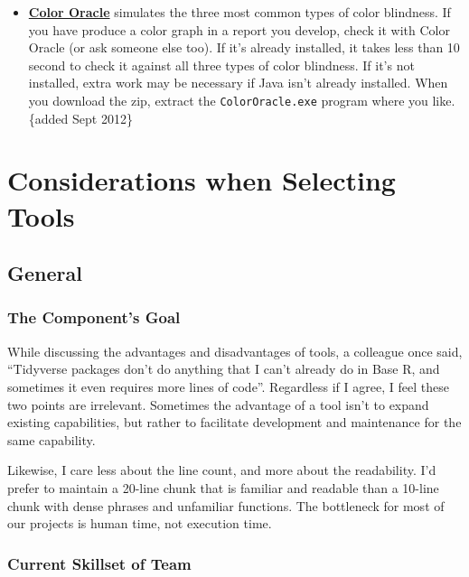 \documentclass[
]{book}
\begin{document}
\begin{itemize}
\item
  \textbf{\href{http://colororacle.org/}{Color Oracle}} simulates the three most common types of color blindness. If you have produce a color graph in a report you develop, check it with Color Oracle (or ask someone else too). If it's already installed, it takes less than 10 second to check it against all three types of color blindness. If it's not installed, extra work may be necessary if Java isn't already installed. When you download the zip, extract the \texttt{ColorOracle.exe} program where you like. \{added Sept 2012\}
\end{itemize}

\hypertarget{tools}{%
\chapter{Considerations when Selecting Tools}\label{tools}}

\hypertarget{general}{%
\section{General}\label{general}}

\hypertarget{the-components-goal}{%
\subsection{The Component's Goal}\label{the-components-goal}}

While discussing the advantages and disadvantages of tools, a colleague once said, ``Tidyverse packages don't do anything that I can't already do in Base R, and sometimes it even requires more lines of code''. Regardless if I agree, I feel these two points are irrelevant. Sometimes the advantage of a tool isn't to expand existing capabilities, but rather to facilitate development and maintenance for the same capability.

Likewise, I care less about the line count, and more about the readability. I'd prefer to maintain a 20-line chunk that is familiar and readable than a 10-line chunk with dense phrases and unfamiliar functions. The bottleneck for most of our projects is human time, not execution time.

\hypertarget{current-skillset-of-team}{%
\subsection{Current Skillset of Team}\label{current-skillset-of-team}}
\end{document}
